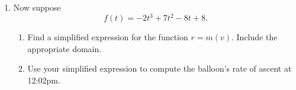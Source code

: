 \documentclass{ximera}
\begin{document}
\begin{question}
\begin{enumerate}
\item Now suppose
\[
   f(t) = -2t^3+7t^2-8t+8 .
\]

\begin{enumerate}
\item Find a simplified expression for the function $r=m(v)$. Include the appropriate domain.

\item Use your simplified expression to compute the balloon's rate of ascent at 12:02pm.
\end{enumerate}



\end{enumerate}

\end{question}
\end{document}

